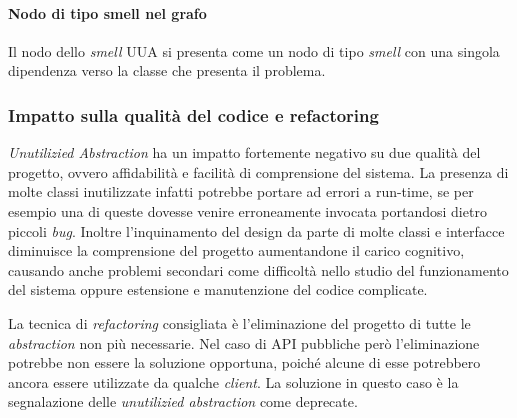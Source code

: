     \paragraph{Nodo di tipo smell nel grafo}
        Il nodo dello \textit{smell} UUA si presenta come un nodo di tipo \textit{smell} con una singola dipendenza verso la classe che presenta il problema.
    
    
     \subsubsection{Impatto sulla qualità del codice e refactoring}
         \textit{Unutilizied Abstraction} ha un impatto fortemente negativo su due qualità del progetto, ovvero affidabilità e facilità di comprensione del sistema. La presenza di molte classi inutilizzate infatti potrebbe portare ad errori a run-time, se per esempio una di queste dovesse venire erroneamente invocata portandosi dietro piccoli \textit{bug}. Inoltre l'inquinamento del design da parte di molte classi e interfacce diminuisce la comprensione del progetto aumentandone il carico cognitivo, causando anche problemi secondari come difficoltà nello studio del funzionamento del sistema oppure estensione e manutenzione del codice complicate.
        
        La tecnica di \textit{refactoring} consigliata è l'eliminazione del progetto di tutte le \textit{abstraction} non più necessarie. Nel caso di API pubbliche però l'eliminazione potrebbe non essere la soluzione opportuna, poiché alcune di esse potrebbero ancora essere utilizzate da qualche \textit{client}. La soluzione in questo caso è la segnalazione delle \textit{unutilizied abstraction} come deprecate.

    
    
